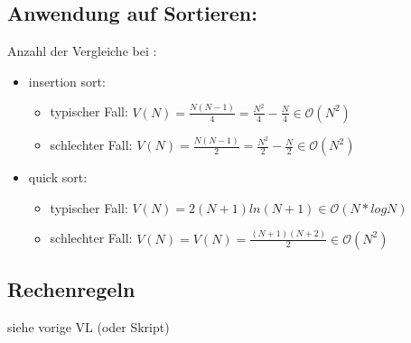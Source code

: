 \documentclass[11pt, fleqn]{scrreprt}
\begin{document}
\subsection*{Anwendung auf Sortieren:}
Anzahl der Vergleiche bei :
\begin{itemize}
	\item insertion sort:
	\begin{itemize}
		\item typischer Fall: $V(N)= \frac{N(N-1)}{4} = \frac{N^2}{4} - \frac{N}{4} \in \mathcal{O}(N^2)$ \\
		\item schlechter Fall: $V(N) = \frac{N(N-1)}{2} = \frac{N^2}{2} - \frac{N}{2} \in  \mathcal{O}(N^2) $\\
	\end{itemize}
	\item quick sort:
	\begin{itemize}
		\item typischer Fall: $V(N) = 2(N+1) ln(N+1) \in \mathcal{O}(N*log N)$
		\item schlechter Fall: $V(N) = V(N) = \frac{(N+1)(N+2)}{2} \in \mathcal{O}(N^2) $\\
	\end{itemize}
\end{itemize}

\subsection*{Rechenregeln}
siehe vorige VL (oder Skript)
\end{document}
